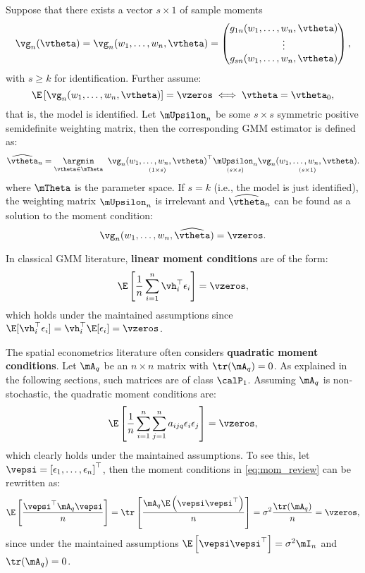 Suppose that there exists a vector $s \times 1$ of sample moments
\begin{equation}\label{eq:sample_moments_gmm}
\vg_n(\vtheta) = \vg_n(w_1, \ldots ,w_n, \vtheta) 
= \begin{pmatrix}
g_{1n}(w_1,\ldots,w_n, \vtheta) \\
\vdots \\
g_{sn}(w_1,\ldots,w_n, \vtheta)
\end{pmatrix},
\end{equation}
%
with $s \geq k$ for identification. Further assume:
\begin{equation*}
\E\left[\vg_n(w_1,\ldots ,w_n, \vtheta)\right] = \vzeros \iff \vtheta = \vtheta_0,
\end{equation*}
%
that is, the model is identified. Let $\mUpsilon_n$ be some $s \times s$ symmetric positive semidefinite weighting matrix, then the corresponding GMM estimator is defined as:
\begin{equation}\label{eq:gmm_one_step}
\widehat{\vtheta}_n = \underset{\vtheta \in \mTheta}{\argmin}\;\;\underset{(1\times s)}{\vg_n(w_1,\ldots,w_n, \vtheta)}^\top\underset{(s\times s)}{\mUpsilon_n}\underset{(s\times 1)}{\vg_n(w_1,\ldots,w_n, \vtheta)}.
\end{equation}
%
where $\mTheta$ is the parameter space. If $s = k$ (i.e., the model is just identified),  the weighting matrix $\mUpsilon_n$ is irrelevant and $\widehat{\vtheta}_n$ can be found as a solution to the moment condition:
\begin{equation}
\vg_n(w_1,\ldots,w_n, \widehat{\vtheta}) = \vzeros.
\end{equation}

In classical GMM literature, \textbf{linear moment conditions} are of the form:
\begin{equation*}
\E\left[\frac{1}{n} \sum_{i=1}^n \vh_i^\top \epsilon_i \right] = \vzeros,
\end{equation*}
which holds under the maintained assumptions since $\E[\vh_i^\top \epsilon_i] = \vh_i^\top \E[\epsilon_i] = \vzeros$.

The spatial econometrics literature often considers \textbf{quadratic moment conditions}. Let $\mA_q$ be an $n \times n$ matrix with $\tr(\mA_q) = 0$. As explained in the following sections, such matrices are of class $\calP_1$. Assuming $\mA_q$ is non-stochastic, the quadratic moment conditions are:
\begin{equation}\label{eq:mom_review}
\E\left[\frac{1}{n} \sum_{i=1}^n \sum_{j=1}^n a_{ijq} \epsilon_i \epsilon_j \right] = \vzeros, 
\end{equation}
%
which clearly holds under the maintained assumptions. To see this, let $\vepsi = \left[\epsilon_1, \ldots ,\epsilon_n\right]^\top$, then the moment conditions in \eqref{eq:mom_review} can be rewritten as:
\begin{equation*}
 \E\left[\frac{\vepsi^\top\mA_q\vepsi}{n}\right] = \tr\left[\frac{\mA_q\E\left(\vepsi\vepsi^\top\right)}{n}\right] = \sigma^2\frac{\tr(\mA_q)}{n} = \vzeros,
\end{equation*}
%
since under the maintained assumptions $\E\left[\vepsi\vepsi^\top\right] = \sigma^2\mI_n$ and $\tr(\mA_q) = 0$.


